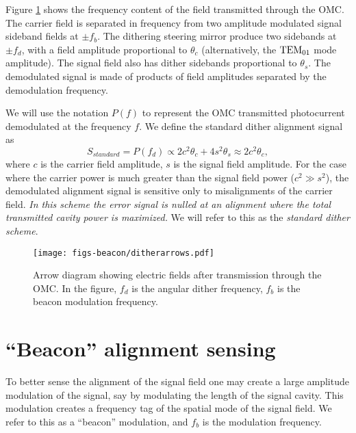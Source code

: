 Figure \ref{fig:ditherarrows} shows the frequency content of the field transmitted through the OMC. %
The carrier field is separated in frequency from two amplitude modulated signal sideband fields at $\pm f_b$. %
The dithering steering mirror produce two sidebands at $\pm f_d$, with a field amplitude proportional to $\theta_c$ (alternatively, the ${\rm TEM}_{01}$ mode amplitude\cite{Sigg:00}). %
The signal field also has dither sidebands proportional to $\theta_s$. %
The demodulated signal is made of products of field amplitudes separated by the demodulation frequency.

We will use the notation $P(f)$ to represent the OMC transmitted photocurrent demodulated at the frequency $f$. %
We define the standard dither alignment signal as
%
\begin{equation}
\label{eq:sstandard}
S_{standard} = P(f_d) \propto 2c^2 \theta_c + 4 s^2 \theta_s \approx 2c^2 \theta_c,
\end{equation}
%
where $c$ is the carrier field amplitude, $s$ is the signal field amplitude. %
For the case where the carrier power is much greater than the signal field power ($c^2 \gg s^2$), the demodulated alignment signal is sensitive only to misalignments of the carrier field. %
{\it In this scheme the error signal is nulled at an alignment where the total transmitted cavity power is maximized.} We will refer to this as the {\it standard dither scheme}.

%
\begin{figure}%
  \begin{center}
  \leavevmode
  \texttt{[image: figs-beacon/ditherarrows.pdf]}
  \end{center}
  \caption[Arrow diagram of dither alignment signals.]{Arrow diagram showing electric fields after transmission through the OMC. In the figure, $f_d$ is the angular dither frequency, $f_b$ is the beacon modulation frequency.}
  \label{fig:ditherarrows}
\end{figure}
%

\section{``Beacon'' alignment sensing}

To better sense the alignment of the signal field one may create a large amplitude modulation of the signal, say by modulating the length of the signal cavity. %
This modulation creates a frequency tag of the spatial mode of the signal field. %
We refer to this as a ``beacon'' %
modulation, and $f_b$ is the modulation frequency.


